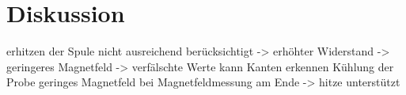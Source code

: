 
\section{Diskussion}
\label{sec:Diskussion}

erhitzen der Spule nicht ausreichend berücksichtigt -> erhöhter Widerstand -> geringeres Magnetfeld -> verfälschte Werte
kann Kanten erkennen Kühlung der Probe
geringes Magnetfeld bei Magnetfeldmessung am Ende -> hitze unterstützt